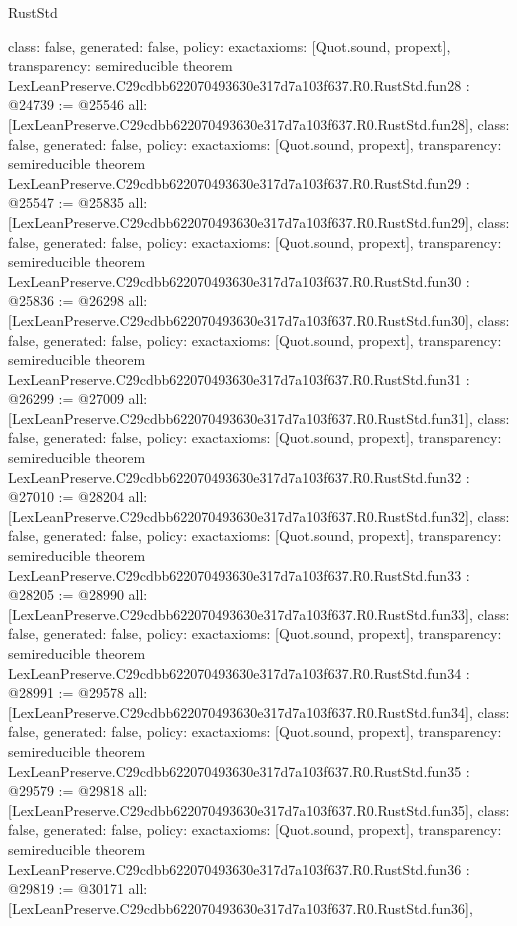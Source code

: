 \begin{lexlean}{RustStd}
\begin{coremodule}
{  class: false,
  generated: false,
  policy: exact{axioms: [Quot.sound, propext]},
  transparency: semireducible
}
theorem LexLeanPreserve.C29cdbb622070493630e317d7a103f637.R0.RustStd.fun28 : @24739 := @25546 {
  all: [LexLeanPreserve.C29cdbb622070493630e317d7a103f637.R0.RustStd.fun28],
  class: false,
  generated: false,
  policy: exact{axioms: [Quot.sound, propext]},
  transparency: semireducible
}
theorem LexLeanPreserve.C29cdbb622070493630e317d7a103f637.R0.RustStd.fun29 : @25547 := @25835 {
  all: [LexLeanPreserve.C29cdbb622070493630e317d7a103f637.R0.RustStd.fun29],
  class: false,
  generated: false,
  policy: exact{axioms: [Quot.sound, propext]},
  transparency: semireducible
}
theorem LexLeanPreserve.C29cdbb622070493630e317d7a103f637.R0.RustStd.fun30 : @25836 := @26298 {
  all: [LexLeanPreserve.C29cdbb622070493630e317d7a103f637.R0.RustStd.fun30],
  class: false,
  generated: false,
  policy: exact{axioms: [Quot.sound, propext]},
  transparency: semireducible
}
theorem LexLeanPreserve.C29cdbb622070493630e317d7a103f637.R0.RustStd.fun31 : @26299 := @27009 {
  all: [LexLeanPreserve.C29cdbb622070493630e317d7a103f637.R0.RustStd.fun31],
  class: false,
  generated: false,
  policy: exact{axioms: [Quot.sound, propext]},
  transparency: semireducible
}
theorem LexLeanPreserve.C29cdbb622070493630e317d7a103f637.R0.RustStd.fun32 : @27010 := @28204 {
  all: [LexLeanPreserve.C29cdbb622070493630e317d7a103f637.R0.RustStd.fun32],
  class: false,
  generated: false,
  policy: exact{axioms: [Quot.sound, propext]},
  transparency: semireducible
}
theorem LexLeanPreserve.C29cdbb622070493630e317d7a103f637.R0.RustStd.fun33 : @28205 := @28990 {
  all: [LexLeanPreserve.C29cdbb622070493630e317d7a103f637.R0.RustStd.fun33],
  class: false,
  generated: false,
  policy: exact{axioms: [Quot.sound, propext]},
  transparency: semireducible
}
theorem LexLeanPreserve.C29cdbb622070493630e317d7a103f637.R0.RustStd.fun34 : @28991 := @29578 {
  all: [LexLeanPreserve.C29cdbb622070493630e317d7a103f637.R0.RustStd.fun34],
  class: false,
  generated: false,
  policy: exact{axioms: [Quot.sound, propext]},
  transparency: semireducible
}
theorem LexLeanPreserve.C29cdbb622070493630e317d7a103f637.R0.RustStd.fun35 : @29579 := @29818 {
  all: [LexLeanPreserve.C29cdbb622070493630e317d7a103f637.R0.RustStd.fun35],
  class: false,
  generated: false,
  policy: exact{axioms: [Quot.sound, propext]},
  transparency: semireducible
}
theorem LexLeanPreserve.C29cdbb622070493630e317d7a103f637.R0.RustStd.fun36 : @29819 := @30171 {
  all: [LexLeanPreserve.C29cdbb622070493630e317d7a103f637.R0.RustStd.fun36],
}
\end{coremodule}
\end{lexlean}

